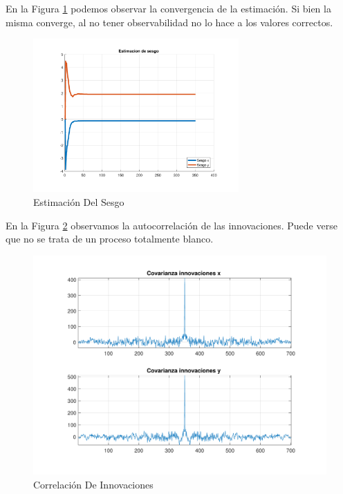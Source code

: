 	En la Figura \ref{fig:ej4e_bias} podemos observar la convergencia de la estimación. Si bien la misma converge, al no tener observabilidad no lo hace a los valores correctos.
	
	\begin{figure}[H]
		\centering
		\includegraphics[width=0.7\textwidth,keepaspectratio]{Figuras/bias_ej4e.pdf}
		\caption{Estimación Del Sesgo}
		\label{fig:ej4e_bias}
	\end{figure}
	
	En la Figura \ref{fig:ej4e_cov} observamos la autocorrelación de las innovaciones. Puede verse que no se trata de un proceso totalmente blanco.
	
	\begin{figure}[H]
		\centering
		\includegraphics[width=1.0\textwidth,keepaspectratio]{Figuras/covinn_ej4e.pdf}
		\caption{Correlación De Innovaciones}
		\label{fig:ej4e_cov}
	\end{figure}

